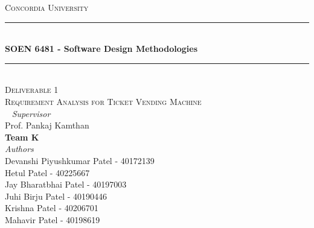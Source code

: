 \documentclass[a4paper, 11pt]{report}
\date{null}
\begin{document}
\begin{titlepage} %
	\newcommand{\HRule}{\rule{\linewidth}{0.5mm}} %
	
	\center %
	
	
	\textsc{\LARGE Concordia University}\\[1.5cm] %
	

	
	\HRule\\[0.4cm]
	
	{\huge\bfseries  SOEN 6481 - Software Design  Methodologies}\\[0.4cm] %
	
	\HRule\\[1.5cm]
	\textsc{\Large Deliverable 1}\\[0.5cm] %
	\textsc{\Large Requirement Analysis for Ticket Vending Machine}\\[0.5cm]
	
			
	~
			\large
			\textit{Supervisor}\\
			Prof. Pankaj Kamthan\\[0.5cm] %
    \vfill
    \large
            \textbf{Team K}\\
			\textit{Authors}\\
		Devanshi Piyushkumar Patel - \textsc{40172139}\\
            Hetul Patel - \textsc{40225667}\\
            Jay Bharatbhai Patel - \textsc{40197003}\\
            Juhi Birju Patel - \textsc{40190446}\\
            Krishna Patel - \textsc {40206701}\\
            Mahavir Patel - \textsc {40198619}\\[0.75cm]
            

\end{titlepage}
\end{document}
